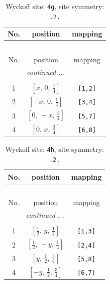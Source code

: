 \documentclass[fleqn,8pt]{jsarticle}
\begin{document}
\begin{longtable}{ccc}
\caption{Wyckoff site: {\tt 4g}, site symmetry: {\tt .2.}}
 \\
 \hline \hline
No. & position & mapping \\ \hline \endfirsthead

\multicolumn{2}{l}{\tablename\ \thetable{}} \\
 \hline \hline
No. & position & mapping \\ \hline \endhead

 \hline \hline
\multicolumn{2}{r}{\footnotesize\it continued ...} \\ \endfoot

 \hline \hline
\multicolumn{2}{r}{} \\ \endlastfoot

1 & $\left[ x,\, 0,\, \frac{1}{4} \right]$ & {\tt [1,2]} \\ \hline
2 & $\left[ - x,\, 0,\, \frac{1}{4} \right]$ & {\tt [3,4]} \\ \hline
3 & $\left[ 0,\, - x,\, \frac{3}{4} \right]$ & {\tt [5,7]} \\ \hline
4 & $\left[ 0,\, x,\, \frac{3}{4} \right]$ & {\tt [6,8]} \\
\end{longtable}
\renewcommand{\arraystretch}{1.2}
\begin{longtable}{ccc}
\caption{Wyckoff site: {\tt 4h}, site symmetry: {\tt .2.}}
 \\
 \hline \hline
No. & position & mapping \\ \hline \endfirsthead

\multicolumn{2}{l}{\tablename\ \thetable{}} \\
 \hline \hline
No. & position & mapping \\ \hline \endhead

 \hline \hline
\multicolumn{2}{r}{\footnotesize\it continued ...} \\ \endfoot

 \hline \hline
\multicolumn{2}{r}{} \\ \endlastfoot

1 & $\left[ \frac{1}{2},\, y,\, \frac{1}{4} \right]$ & {\tt [1,3]} \\ \hline
2 & $\left[ \frac{1}{2},\, - y,\, \frac{1}{4} \right]$ & {\tt [2,4]} \\ \hline
3 & $\left[ y,\, \frac{1}{2},\, \frac{3}{4} \right]$ & {\tt [5,8]} \\ \hline
4 & $\left[ - y,\, \frac{1}{2},\, \frac{3}{4} \right]$ & {\tt [6,7]} \\
\end{longtable}
\end{document}
